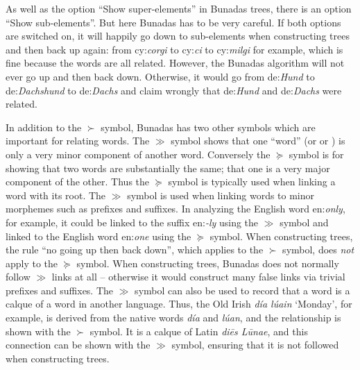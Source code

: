 \documentclass[output=paper,colorlinks,citecolor=brown]{langscibook}
\begin{document}
As well as the option ``Show super-elements” in Bunadas trees, there is an option ``Show sub-elements”. But here Bunadas has to be very careful. If both options are switched on, it will happily go down to sub-elements when constructing trees and then back up again: from cy:\textit{corgi} to cy:\textit{ci} to cy:\textit{milgi} for example, which is fine because the words are all related. However, the Bunadas algorithm will not ever go up and then back down. Otherwise, it would go from de:\textit{Hund} to de:\textit{Dachshund} to de:\textit{Dachs} and claim wrongly that de:\textit{Hund} and de:\textit{Dachs} were related.

In addition to the ${\succ}$ symbol, Bunadas has two other symbols which are important for relating words. The ${\gg}$ symbol shows that one ``word” (or  or ) is only a very minor component of another word. Conversely the ${\succcurlyeq}$ symbol is for showing that two words are substantially the same; that one is a very major component of the other. Thus the ${\succcurlyeq}$ symbol is typically used when linking a word with its root. The ${\gg}$ symbol is used when linking words to minor morphemes such as prefixes and suffixes. In analyzing the English word en:\textit{only}, for example, it could be linked to the suffix en:\textit{{}-ly} using the ${\gg}$ symbol and linked to the English word en:\textit{one} using the ${\succcurlyeq}$ symbol. When constructing trees, the rule ``no going up then back down”, which applies to the ${\succ}$ symbol, does \textit{not} apply to the ${\succcurlyeq}$ symbol. When constructing trees, Bunadas does not normally follow ${\gg}$ links at all – otherwise it would construct many false links via trivial prefixes and suffixes. The ${\gg}$ symbol can also be used to record that a word is a calque of a word in another language. Thus, the Old Irish \textit{día lúain} ‘Monday’, for example, is derived from the native words \textit{día} and \textit{lúan}, and the relationship is shown with the ${\succ}$ symbol. It is a calque of Latin \textit{diēs Lūnae}, and this connection can be shown with the ${\gg}$ symbol, ensuring that it is not followed when constructing trees.
\end{document}
